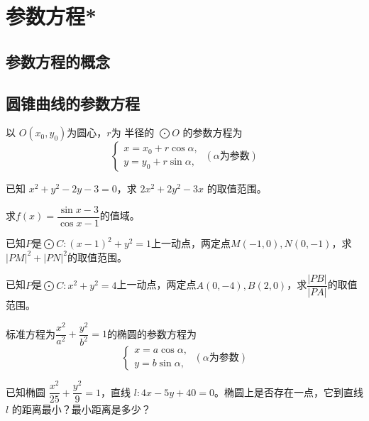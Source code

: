 \section{参数方程*}
\subsection{参数方程的概念}
\clearpage
\subsection{圆锥曲线的参数方程}
\begin{theorem}[圆的参数方程]
    以 \( O(x_0, y_0) \)为圆心，\(r\)为 半径的 \( \bigodot O  \) 的参数方程为
    \[\left\{
    \begin{gathered}
        x = x_0 + r \cos \alpha, \\
        y = y_0 + r \sin \alpha,
    \end{gathered}\right.
    \ (\alpha\text{为参数})
    \]
\end{theorem}


\begin{example}
    已知 \(x^2 + y^2 - 2y - 3 = 0\)，求 \(2x^2 + 2y^2 - 3x\) 的取值范围。
\end{example}

\begin{example}
    求\(f(x)=\dfrac{\sin x-3}{\cos x -1}\)的值域。
\end{example}

\begin{example}
    已知\(P\)是\(\bigodot C:(x-1)^2+y^2=1\)上一动点，两定点\(M(-1,0), N(0,-1)\)，求\(|PM|^2+|PN|^2\)的取值范围。
\end{example}
\begin{exercise}
    已知\(P\)是\(\bigodot C:x^2+y^2=4\)上一动点，两定点\(A(0,-4), B(2,0)\)，求\(\dfrac{|PB|}{|PA|}\)的取值范围。
\end{exercise}
\begin{theorem}[椭圆的参数方程]
标准方程为\(\dfrac{x^2}{a^2}+\dfrac{y^2}{b^2}=1\)的椭圆的参数方程为
    \[\left\{
    \begin{gathered}
        x = a \cos \alpha, \\
        y = b \sin \alpha,
    \end{gathered}\right.
    \ (\alpha\text{为参数})
    \]
\end{theorem}
\begin{corollary}[椭圆参数方程中参数的几何意义]
    
\end{corollary}
\begin{example}
    已知椭圆 \(\dfrac{x^2}{25} + \dfrac{y^2}{9} = 1\)，直线 \(l: 4x - 5y + 40 = 0\)。椭圆上是否存在一点，它到直线 \(l\) 的距离最小？最小距离是多少？
\end{example}


